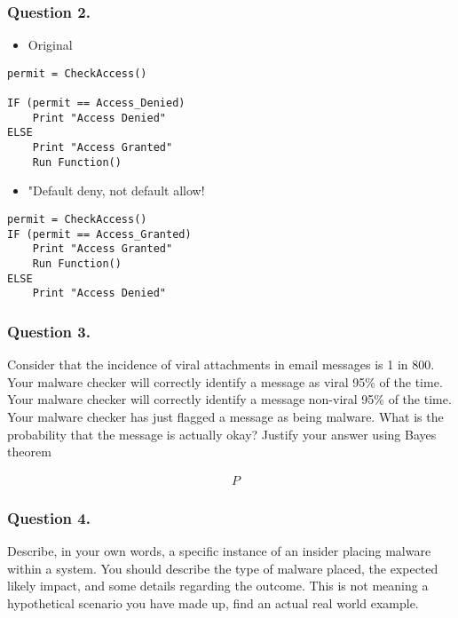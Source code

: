 \documentclass[11pt]{article}
\providecommand{\tightlist}{%
      \setlength{\itemsep}{0pt}\setlength{\parskip}{0pt}}
\begin{document}
    \hypertarget{question-2.}{%
\subsubsection{Question 2.}\label{question-2.}}

\begin{itemize}
\tightlist
\item
  Original
\end{itemize}

\begin{verbatim}
permit = CheckAccess()

IF (permit == Access_Denied)
    Print "Access Denied"
ELSE 
    Print "Access Granted"
    Run Function()
\end{verbatim}

\begin{itemize}
\tightlist
\item
  "Default deny, not default allow!
\end{itemize}

\begin{verbatim}
permit = CheckAccess()
IF (permit == Access_Granted)
    Print "Access Granted"
    Run Function()
ELSE
    Print "Access Denied"
\end{verbatim}

    \hypertarget{question-3.}{%
\subsubsection{Question 3.}\label{question-3.}}

Consider that the incidence of viral attachments in email messages is 1
in 800. Your malware checker will correctly identify a message as viral
95\% of the time. Your malware checker will correctly identify a message
non-viral 95\% of the time. Your malware checker has just flagged a
message as being malware. What is the probability that the message is
actually okay? Justify your answer using Bayes theorem

\[
\begin{align*}
& P
\end{align*}
\]

    \hypertarget{question-4.}{%
\subsubsection{Question 4.}\label{question-4.}}

Describe, in your own words, a specific instance of an insider placing
malware within a system. You should describe the type of malware placed,
the expected likely impact, and some details regarding the outcome. This
is not meaning a hypothetical scenario you have made up, find an actual
real world example.
\end{document}
